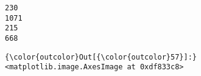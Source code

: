 \documentclass[11pt]{article}
\begin{document}
    \begin{Verbatim}[commandchars=\\\{\}]
230
1071
215
668

    \end{Verbatim}

\begin{Verbatim}[commandchars=\\\{\}]
{\color{outcolor}Out[{\color{outcolor}57}]:} <matplotlib.image.AxesImage at 0xdf833c8>
\end{Verbatim}
            
    \begin{center}
    \end{center}
    { \hspace*{\fill} \\}
    
    \begin{center}
    \end{center}
    { \hspace*{\fill} \\}
    
    \begin{center}
    \end{center}
    { \hspace*{\fill} \\}
    
    \begin{center}
    \end{center}
    { \hspace*{\fill} \\}
    
    \begin{center}
    \end{center}
    { \hspace*{\fill} \\}
    
    \begin{center}
    \end{center}
    { \hspace*{\fill} \\}
    

    
    
    
    
\end{document}
